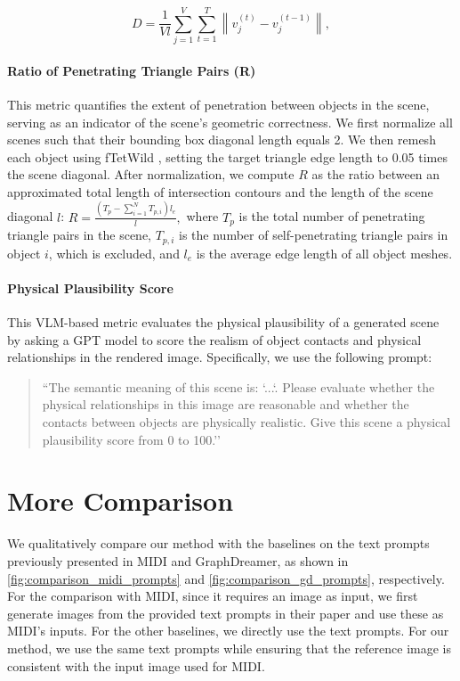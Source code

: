 \begin{equation}
D = \frac{1}{V l} 
\sum_{j=1}^{V} \sum_{t=1}^{T} 
\left\| v_j^{(t)} - v_j^{(t-1)} \right\|,
\label{eq:vertex_displacement_consecutive}
\end{equation}

\paragraph{Ratio of Penetrating Triangle Pairs (R)} This metric quantifies the extent of penetration between objects in the scene, serving as an indicator of the scene's geometric correctness. We first normalize all scenes such that their bounding box diagonal length equals 2. We then remesh each object using fTetWild \cite{ftetwild}, setting the target triangle edge length to 0.05 times the scene diagonal. After normalization, we compute $R$ as the ratio between an approximated total length of intersection contours and the length of the scene diagonal $l$:
$
R = \frac{(T_p - \sum_{i=1}^{N} T_{p,i})l_e}{l},
$
where \(T_p\) is the total number of penetrating triangle pairs in the scene, \(T_{p,i}\) is the number of self-penetrating triangle pairs in object \(i\), which is excluded, and $l_e$ is the average edge length of all object meshes.  


\paragraph{Physical Plausibility Score} 

This VLM-based metric evaluates the physical plausibility of a generated scene by asking a GPT model to score the realism of object contacts and physical relationships in the rendered image. Specifically, we use the following prompt:

\begin{quote}
\small
``The semantic meaning of this scene is: `...`. Please evaluate whether the physical relationships in this image are reasonable and whether the contacts between objects are physically realistic. Give this scene a physical plausibility score from 0 to 100.''
\end{quote}

\section{More Comparison}\label{supp:more_comparison}

We qualitatively compare our method with the baselines on the text prompts previously presented in MIDI and GraphDreamer, as shown in \autoref{fig:comparison_midi_prompts} and \autoref{fig:comparison_gd_prompts}, respectively. For the comparison with MIDI, since it requires an image as input, we first generate images from the provided text prompts in their paper and use these as MIDI’s inputs. For the other baselines, we directly use the text prompts. For our method, we use the same text prompts while ensuring that the reference image is consistent with the input image used for MIDI.
